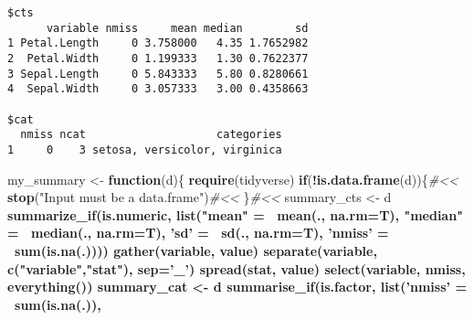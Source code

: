 \documentclass[12pt,letterpaperpaper,openany]{book}
\newenvironment{Shaded}{\begin{snugshade}}{\end{snugshade}}
\newcommand{\CommentTok}[1]{\textcolor[rgb]{0.56,0.35,0.01}{\textit{#1}}}
\newcommand{\ControlFlowTok}[1]{\textcolor[rgb]{0.13,0.29,0.53}{\textbf{#1}}}
\newcommand{\DataTypeTok}[1]{\textcolor[rgb]{0.13,0.29,0.53}{#1}}
\newcommand{\ErrorTok}[1]{\textcolor[rgb]{0.64,0.00,0.00}{\textbf{#1}}}
\newcommand{\KeywordTok}[1]{\textcolor[rgb]{0.13,0.29,0.53}{\textbf{#1}}}
\newcommand{\NormalTok}[1]{#1}
\newcommand{\OperatorTok}[1]{\textcolor[rgb]{0.81,0.36,0.00}{\textbf{#1}}}
\newcommand{\StringTok}[1]{\textcolor[rgb]{0.31,0.60,0.02}{#1}}
\begin{document}
\begin{verbatim}
$cts
      variable nmiss     mean median        sd
1 Petal.Length     0 3.758000   4.35 1.7652982
2  Petal.Width     0 1.199333   1.30 0.7622377
3 Sepal.Length     0 5.843333   5.80 0.8280661
4  Sepal.Width     0 3.057333   3.00 0.4358663

$cat
  nmiss ncat                    categories
1     0    3 setosa, versicolor, virginica
\end{verbatim}

\begin{Shaded}
\begin{Highlighting}[]
\NormalTok{ my_summary <-}\StringTok{ }\ControlFlowTok{function}\NormalTok{(d)\{}
   \KeywordTok{require}\NormalTok{(tidyverse)}
   \ControlFlowTok{if}\NormalTok{(}\OperatorTok{!}\KeywordTok{is.data.frame}\NormalTok{(d))\{}\CommentTok{#<<}
     \KeywordTok{stop}\NormalTok{(}\StringTok{"Input must be a data.frame"}\NormalTok{)}\CommentTok{#<<}
\NormalTok{   \}}\CommentTok{#<<}
\NormalTok{   summary_cts <-}\StringTok{ }\NormalTok{d }\OperatorTok{%>%}
\StringTok{     }\KeywordTok{summarize_if}\NormalTok{(is.numeric, }\KeywordTok{list}\NormalTok{(}\StringTok{"mean"}\NormalTok{ =}\StringTok{ }\ErrorTok{~}\KeywordTok{mean}\NormalTok{(., }\DataTypeTok{na.rm=}\NormalTok{T),}
                                   \StringTok{"median"}\NormalTok{ =}\StringTok{ }\ErrorTok{~}\KeywordTok{median}\NormalTok{(., }\DataTypeTok{na.rm=}\NormalTok{T),}
                                   \StringTok{'sd'}\NormalTok{ =}\StringTok{ }\ErrorTok{~}\KeywordTok{sd}\NormalTok{(., }\DataTypeTok{na.rm=}\NormalTok{T),}
                                   \StringTok{'nmiss'}\NormalTok{ =}\StringTok{ }\ErrorTok{~}\KeywordTok{sum}\NormalTok{(}\KeywordTok{is.na}\NormalTok{(.)))) }\OperatorTok{%>%}
\StringTok{     }\KeywordTok{gather}\NormalTok{(variable, value) }\OperatorTok{%>%}
\StringTok{     }\KeywordTok{separate}\NormalTok{(variable, }\KeywordTok{c}\NormalTok{(}\StringTok{"variable"}\NormalTok{,}\StringTok{"stat"}\NormalTok{), }\DataTypeTok{sep=}\StringTok{'_'}\NormalTok{) }\OperatorTok{%>%}
\StringTok{     }\KeywordTok{spread}\NormalTok{(stat, value) }\OperatorTok{%>%}
\StringTok{     }\KeywordTok{select}\NormalTok{(variable, nmiss, }\KeywordTok{everything}\NormalTok{())}
\NormalTok{   summary_cat <-}\StringTok{ }\NormalTok{d }\OperatorTok{%>%}
\StringTok{     }\KeywordTok{summarise_if}\NormalTok{(is.factor, }\KeywordTok{list}\NormalTok{(}\StringTok{'nmiss'}\NormalTok{ =}\StringTok{ }\ErrorTok{~}\KeywordTok{sum}\NormalTok{(}\KeywordTok{is.na}\NormalTok{(.)),}
}}}}}}
\end{Highlighting}
\end{Shaded}
\end{document}
